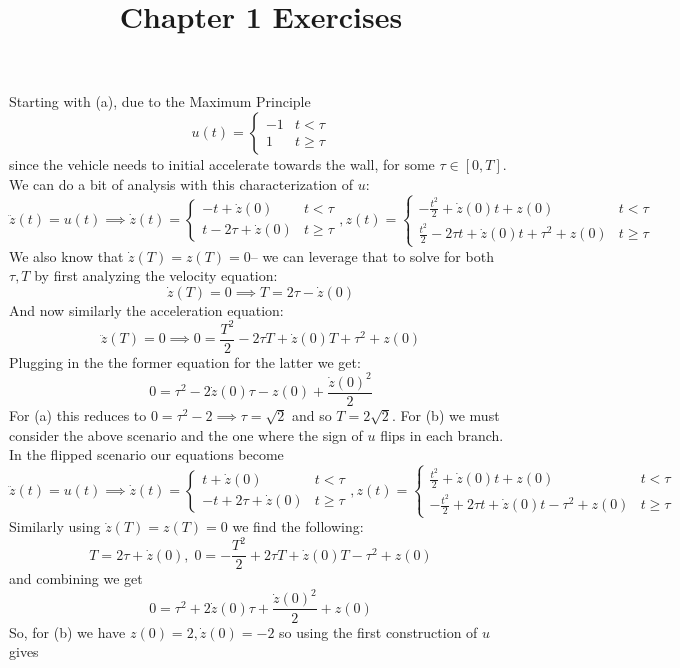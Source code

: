 \documentclass{article}
\title{Chapter 1 Exercises}
\newenvironment{ex}[1]
  {\renewcommand\theexercise{#1}\exercise}
  {\endexercise}
\begin{document}
\begin{ex}{1.2}
  Starting with (a), due to the Maximum Principle
  $$
  u(t) = \begin{cases} -1 & t < \tau \\ 1 & t \ge \tau \end{cases}
  $$
  since the vehicle needs to initial accelerate towards the wall, for some $\tau \in [0, T]$. We can do a bit of analysis with this characterization of $u$:
  $$
    \ddot{z}(t) = u(t) \implies \dot{z}(t) = \begin{cases} 
      -t + \dot{z}(0) & t < \tau \\
      t - 2\tau + \dot{z}(0) & t \ge \tau
    \end{cases}, z(t) = \begin{cases}
      -\frac{t^2}{2} + \dot{z}(0)t + z(0) & t < \tau \\
      \frac{t^2}{2} - 2\tau t + \dot{z}(0) t + \tau^2 + z(0) & t \ge \tau
    \end{cases}
  $$
  We also know that $\dot{z}(T) = z(T) = 0$-- we can leverage that to solve for both $\tau, T$ by first analyzing the velocity equation:
  $$
  \dot{z}(T) = 0 \implies T = 2\tau - \dot{z}(0)
  $$
  And now similarly the acceleration equation:
  $$
  \ddot{z}(T) = 0 \implies 0 = \frac{T^2}{2} - 2\tau T + \dot{z}(0) T + \tau^2 + z(0)
  $$
  Plugging in the the former equation for the latter we get:
  $$
  0 = \tau^2 - 2 \dot{z}(0) \tau - z(0) + \frac{\dot{z}(0)^2}{2}
  $$
  For (a) this reduces to $0 = \tau^2 - 2 \implies \tau = \sqrt{2}$ and so $T = 2\sqrt{2}$. For (b) we must consider the above scenario and the one where the sign of $u$ flips in each branch. In the flipped scenario our equations become
  $$
    \ddot{z}(t) = u(t) \implies \dot{z}(t) = \begin{cases} 
      t + \dot{z}(0) & t < \tau \\
      -t + 2\tau + \dot{z}(0) & t \ge \tau
    \end{cases}, z(t) = \begin{cases}
      \frac{t^2}{2} + \dot{z}(0)t + z(0) & t < \tau \\
      -\frac{t^2}{2} + 2\tau t + \dot{z}(0)t - \tau^2 + z(0) & t \ge \tau
    \end{cases}
  $$
  Similarly using $\dot{z}(T) = z(T) = 0$ we find the following:
  $$
  T = 2\tau + \dot{z}(0), \; 0 = -\frac{T^2}{2} + 2\tau T + \dot{z}(0)T - \tau^2 + z(0)
  $$
  and combining we get
  $$
  0 = \tau^2 + 2\dot{z}(0)\tau + \frac{\dot{z}(0)^2}{2} + z(0)
  $$
  So, for (b) we have $z(0) = 2, \dot{z}(0) = -2$ so using the first construction of $u$ gives

\end{ex}
\end{document}
